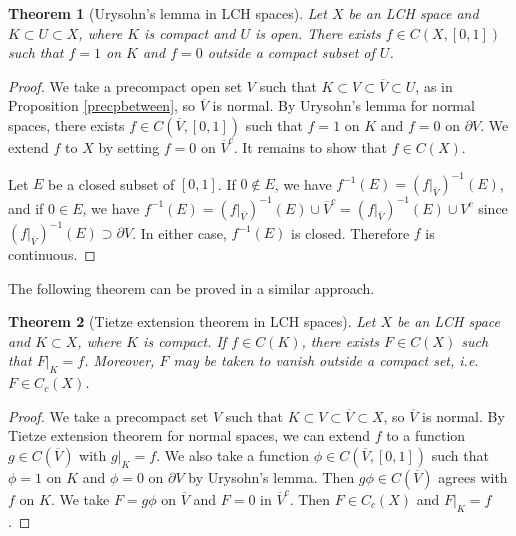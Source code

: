 \documentclass{article}
\numberwithin{equation}{section}
\newcommand{\ol}{\overline}
\theoremstyle{plain}
\newtheorem{theorem}{Theorem}[section]
\theoremstyle{definition}
\begin{document}
\begin{theorem}[Urysohn's lemma in LCH spaces]\label{urysohnlch}
	Let $X$ be an LCH space and $K\subset U\subset X$, where $K$ is compact and $U$ is open. There exists $f\in C(X,[0,1])$ such that $f=1$ on $K$ and $f=0$ outside a compact subset of $U$.
\end{theorem}
\begin{proof}
	We take a precompact open set $V$ such that $K\subset V\subset\ol{V}\subset U$, as in Proposition \ref{precpbetween}, so $\ol{V}$ is normal. By Urysohn's lemma for normal spaces, there exists $f\in C(\ol{V},[0,1])$ such that $f=1$ on $K$ and $f=0$ on $\partial V$. We extend $f$ to $X$ by setting $f=0$ on $\ol{V}^c$. It remains to show that $f\in C(X)$.
	
	Let $E$ be a closed subset of $[0,1]$. If $0\notin E$, we have $f^{-1}(E)=(f|_{\ol{V}})^{-1}(E)$, and if $0\in E$, we have $f^{-1}(E)=(f|_{\ol{V}})^{-1}(E)\cup\ol{V}^c=(f|_{\ol{V}})^{-1}(E)\cup V^c$ since $(f|_{\ol{V}})^{-1}(E)\supset\partial V$. In either case, $f^{-1}(E)$ is closed. Therefore $f$ is continuous.
\end{proof}

The following theorem can be proved in a similar approach.
\begin{theorem}[Tietze extension theorem in LCH spaces]
	Let $X$ be an LCH space and $K\subset X$, where $K$ is compact. If $f\in C(K)$, there exists $F\in C(X)$ such that $F|_K=f$. Moreover, $F$ may be taken to vanish outside a compact set, i.e. $F\in C_c(X)$.
\end{theorem}
\begin{proof}
	We take a precompact set $V$ such that $K\subset V\subset\ol{V}\subset X$, so $\ol{V}$ is normal. By Tietze extension theorem for normal spaces, we can extend $f$ to a function $g\in C(\ol{V})$ with $g|_K=f$. We also take a function $\phi\in C(\ol{V},[0,1])$ such that $\phi=1$ on $K$ and $\phi=0$ on $\partial V$ by Urysohn's lemma. Then $g\phi\in C(\ol{V})$ agrees with $f$ on $K$. We take $F=g\phi$ on $\ol{V}$ and $F=0$ in $\ol{V}^c$. Then $F\in C_c(X)$ and $F|_K=f$. 
\end{proof}
\end{document}
